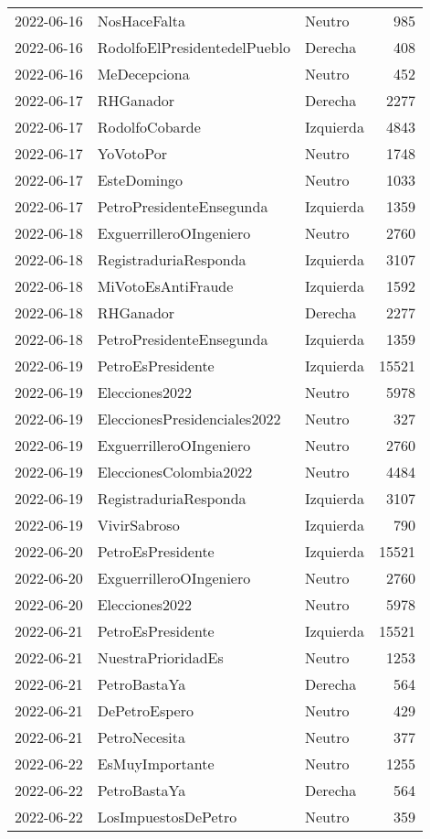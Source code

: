 \begin{longtable}{lllr}
2022-06-16 & NosHaceFalta & Neutro & 985 \\
2022-06-16 & RodolfoElPresidentedelPueblo & Derecha & 408 \\
2022-06-16 & MeDecepciona & Neutro & 452 \\
2022-06-17 & RHGanador & Derecha & 2277 \\
2022-06-17 & RodolfoCobarde & Izquierda & 4843 \\
2022-06-17 & YoVotoPor & Neutro & 1748 \\
2022-06-17 & EsteDomingo & Neutro & 1033 \\
2022-06-17 & PetroPresidenteEnsegunda & Izquierda & 1359 \\
2022-06-18 & ExguerrilleroOIngeniero & Neutro & 2760 \\
2022-06-18 & RegistraduriaResponda & Izquierda & 3107 \\
2022-06-18 & MiVotoEsAntiFraude & Izquierda & 1592 \\
2022-06-18 & RHGanador & Derecha & 2277 \\
2022-06-18 & PetroPresidenteEnsegunda & Izquierda & 1359 \\
2022-06-19 & PetroEsPresidente & Izquierda & 15521 \\
2022-06-19 & Elecciones2022 & Neutro & 5978 \\
2022-06-19 & EleccionesPresidenciales2022 & Neutro & 327 \\
2022-06-19 & ExguerrilleroOIngeniero & Neutro & 2760 \\
2022-06-19 & EleccionesColombia2022 & Neutro & 4484 \\
2022-06-19 & RegistraduriaResponda & Izquierda & 3107 \\
2022-06-19 & VivirSabroso & Izquierda & 790 \\
2022-06-20 & PetroEsPresidente & Izquierda & 15521 \\
2022-06-20 & ExguerrilleroOIngeniero & Neutro & 2760 \\
2022-06-20 & Elecciones2022 & Neutro & 5978 \\
2022-06-21 & PetroEsPresidente & Izquierda & 15521 \\
2022-06-21 & NuestraPrioridadEs & Neutro & 1253 \\
2022-06-21 & PetroBastaYa & Derecha & 564 \\
2022-06-21 & DePetroEspero & Neutro & 429 \\
2022-06-21 & PetroNecesita & Neutro & 377 \\
2022-06-22 & EsMuyImportante & Neutro & 1255 \\
2022-06-22 & PetroBastaYa & Derecha & 564 \\
2022-06-22 & LosImpuestosDePetro & Neutro & 359 \\
\end{longtable}

